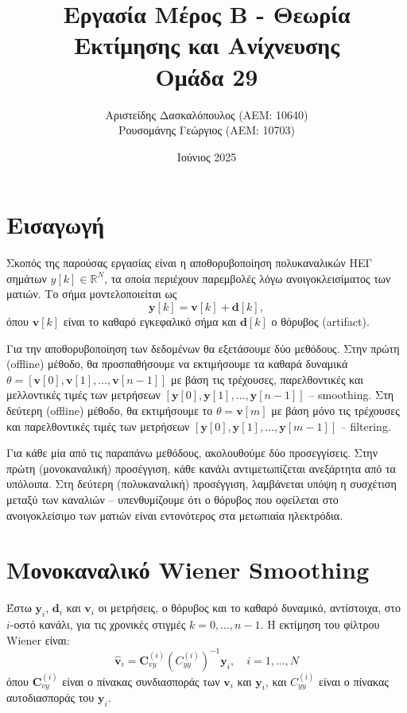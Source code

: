 \documentclass[a4paper,12pt]{article}
\title{Εργασία Μέρος Β - Θεωρία Εκτίμησης και Ανίχνευσης \\[0.5cm] Ομάδα 29}
\author{Αριστείδης Δασκαλόπουλος (ΑΕΜ: 10640) \\ Ρουσομάνης Γεώργιος (ΑΕΜ: 10703)}
\date{Ιούνιος 2025}
\begin{document}
\maketitle

\section*{Εισαγωγή}

Σκοπός της παρούσας εργασίας είναι η αποθορυβοποίηση πολυκαναλικών ΗΕΓ σημάτων $y[k] \in \mathbb{R}^N$, τα οποία περιέχουν παρεμβολές λόγω ανοιγοκλεισίματος των ματιών. Το σήμα μοντελοποιείται ως
\[
\mathbf{y}[k] = \mathbf{v}[k] + \mathbf{d}[k],
\]
όπου $\mathbf{v}[k]$ είναι το καθαρό εγκεφαλικό σήμα και $\mathbf{d}[k]$ ο θόρυβος 
(artifact). 

Για την αποθορυβοποίηση των δεδομένων θα εξετάσουμε δύο μεθόδους. Στην πρώτη 
(offline) μέθοδο, θα προσπαθήσουμε να 
εκτιμήσουμε τα καθαρά δυναμικά 
$\theta = [\mathbf{v}[0], \mathbf{v}[1], \ldots, \mathbf{v}[n-1]]$
με βάση τις τρέχουσες, παρελθοντικές και μελλοντικές τιμές των μετρήσεων 
$[\mathbf{y}[0], \mathbf{y}[1], \ldots, \mathbf{y}[n-1]]$ 
-- smoothing. Στη δεύτερη 
(offline) μέθοδο, θα εκτιμήσουμε το 
$\theta = \mathbf{v}[m]$ με βάση μόνο τις τρέχουσες και παρελθοντικές τιμές των μετρήσεων 
$[\mathbf{y}[0], \mathbf{y}[1], \ldots, \mathbf{y}[m-1]]$
-- filtering.

Για κάθε μία από τις παραπάνω μεθόδους, ακολουθούμε δύο προσεγγίσεις. Στην πρώτη (μονοκαναλική) προσέγγιση, 
κάθε κανάλι αντιμετωπίζεται ανεξάρτητα από τα υπόλοιπα. Στη δεύτερη (πολυκαναλική) προσέγγιση, λαμβάνεται 
υπόψη η συσχέτιση μεταξύ των καναλιών – υπενθυμίζουμε ότι ο θόρυβος που οφείλεται στο ανοιγοκλείσιμο των 
ματιών είναι εντονότερος στα μετωπιαία ηλεκτρόδια.

\section*{Μονοκαναλικό Wiener Smoothing}
Έστω $\mathbf{y}_i$, $\mathbf{d}_i$ και $\mathbf{v}_i$ οι μετρήσεις, ο θόρυβος και το καθαρό δυναμικό, 
αντίστοιχα, στο $i$-οστό κανάλι, για τις χρονικές στιγμές $k = 0, \ldots, n - 1$.  
Η εκτίμηση του φίλτρου Wiener είναι:
\[
\hat{\mathbf{v}}_i = \mathbf{C}_{vy}^{(i)}\left(C_{yy}^{(i)}\right)^{-1}\mathbf{y}_i, \quad i = 1,...,N
\]
όπου $\mathbf{C}_{vy}^{(i)}$ είναι ο πίνακας συνδιασποράς των $\mathbf{v}_i$ και $\mathbf{y}_i$, και 
$C_{yy}^{(i)}$ είναι ο πίνακας αυτοδιασποράς του $\mathbf{y}_i$.
\end{document}
